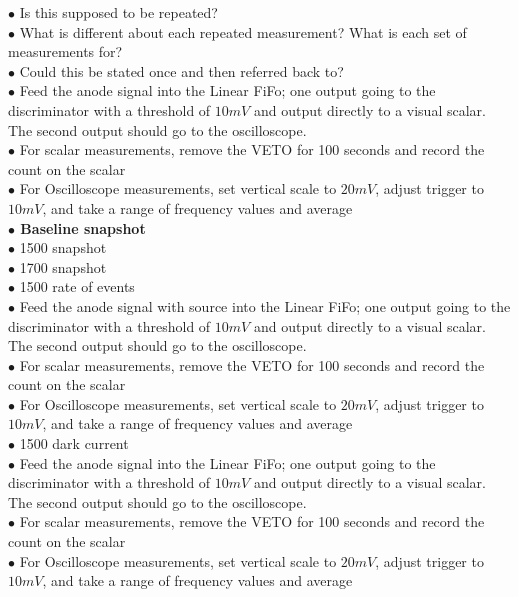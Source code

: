 {\color{blue}$\bullet$ Is this supposed to be repeated?}\\
{\color{blue}$\bullet$ What is different about each repeated measurement? What is each set of measurements for?}\\
{\color{blue}$\bullet$ Could this be stated once and then referred back to?}\\
$\bullet$ Feed the anode signal into the Linear FiFo; one output going to the discriminator with a threshold of $10 mV$ and output directly to a visual scalar. The second output should go to the oscilloscope.\\
$\bullet$ For scalar measurements, remove the VETO for 100 seconds and record the count on the scalar\\
$\bullet$ For Oscilloscope measurements, set vertical scale to $20 mV$, adjust trigger to $10 mV$, and take a range of frequency values and average\\

\textbf{\color[rgb]{1,0.5,0}$\bullet$ Baseline snapshot}\\
$\bullet$ 1500 snapshot\\
$\bullet$ 1700 snapshot\\
$\bullet$ 1500 rate of events\\
$\bullet$ Feed the anode signal with source into the Linear FiFo; one output going to the discriminator with a threshold of $10 mV$ and output directly to a visual scalar. The second output should go to the oscilloscope.\\
$\bullet$ For scalar measurements, remove the VETO for 100 seconds and record the count on the scalar\\
$\bullet$ For Oscilloscope measurements, set vertical scale to $20 mV$, adjust trigger to $10 mV$, and take a range of frequency values and average\\
$\bullet$ 1500 dark current\\
$\bullet$ Feed the anode signal into the Linear FiFo; one output going to the discriminator with a threshold of $10 mV$ and output directly to a visual scalar. The second output should go to the oscilloscope.\\
$\bullet$ For scalar measurements, remove the VETO for 100 seconds and record the count on the scalar\\
$\bullet$ For Oscilloscope measurements, set vertical scale to $20 mV$, adjust trigger to $10 mV$, and take a range of frequency values and average\\

